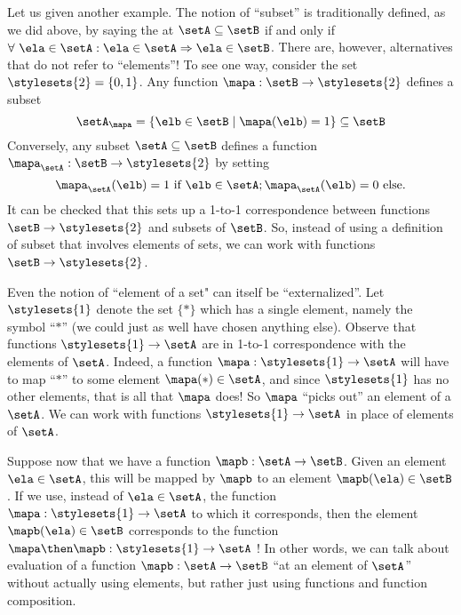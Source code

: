 Let us given another example. The notion of ``subset'' is traditionally defined, as we did above, by saying the at $\setA \subseteq \setB$ if and only if $\forall \ \ela \in \setA : \ela \in \setA \Rightarrow \ela \in \setB$. There are, however, alternatives that do not refer to ``elements''! To see one way, consider the set $\stylesets{2} = \{ 0, 1\}$. Any function $\mapa : \setB \to \stylesets{2}$ defines a subset 
\begin{equation}
\setA_\mapa = \{ \elb \in \setB \mid \mapa(\elb) = 1 \} \subseteq \setB
\end{equation}
Conversely, any subset $\setA \subseteq \setB$ defines a function $\mapa_\setA : \setB \to \stylesets{2}$ by setting 
\begin{equation}
\mapa_\setA(\elb) = 1 \text{ if } \elb \in \setA; \mapa_\setA(\elb) = 0 \text{ else}. 
\end{equation}
It can be checked that this sets up a 1-to-1 correspondence between functions $\setB \to \stylesets{2}$ and subsets of $\setB$. So, instead of using a definition of subset that involves elements of sets, we can work with functions $\setB \to \stylesets{2}$. 

Even the notion of ``element of a set" can itself be ``externalized''. Let $\stylesets{1}$ denote the set $\{ * \}$ which has a single element, namely the symbol ``$*$'' (we could just as well have chosen anything else). Observe that functions $\stylesets{1} \to \setA$ are in 1-to-1 correspondence with the elements of $\setA$. Indeed, a function $\mapa: \stylesets{1} \to \setA$ will have to map ``$*$'' to some element $\mapa(*) \in \setA$, and since $\stylesets{1}$ has no other elements, that is all that $\mapa$ does! So $\mapa$ ``picks out'' an element of a $\setA$. We can work with functions $\stylesets{1} \to \setA$ in place of elements of $\setA$.


Suppose now that we have a function $\mapb : \setA \to \setB$. Given an element $\ela \in \setA$, this will be mapped by $\mapb$ to an element $\mapb(\ela) \in \setB$. If we use, instead of $\ela \in \setA$, the function $\mapa : \stylesets{1} \to \setA$ to which it corresponds, then the element $\mapb(\ela) \in \setB$ corresponds to the function $\mapa \then \mapb: \stylesets{1} \to \setA$ ! In other words, we can talk about evaluation of a function $\mapb : \setA \to \setB$ ``at an element of $\setA$'' without actually using elements, but rather just using functions and function composition. 


\

